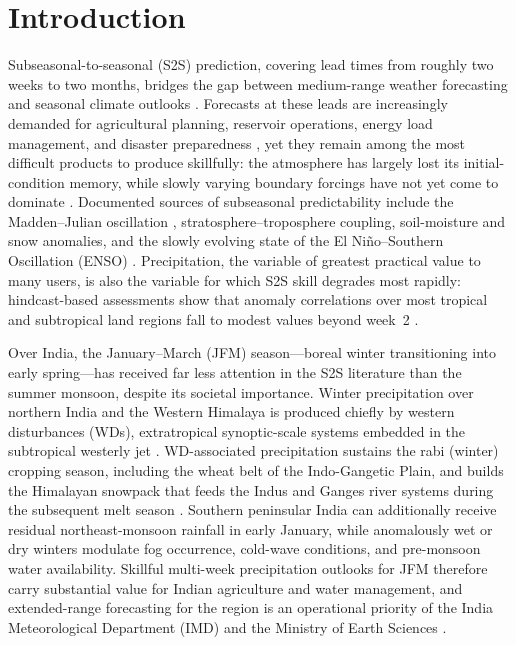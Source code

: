 \documentclass[11pt,a4paper]{article}
\begin{document}
\section{Introduction}\label{sec:intro}

Subseasonal-to-seasonal (S2S) prediction, covering lead times from
roughly two weeks to two months, bridges the gap between medium-range
weather forecasting and seasonal climate outlooks
\citep{vitart2017,nas2016}. Forecasts at these leads are increasingly
demanded for agricultural planning, reservoir operations, energy load
management, and disaster preparedness \citep{white2017}, yet they
remain among the most difficult products to produce skillfully: the
atmosphere has largely lost its initial-condition memory, while slowly
varying boundary forcings have not yet come to dominate
\citep{mariotti2020}. Documented sources of subseasonal predictability
include the Madden--Julian oscillation \citep[MJO;][]{zhang2005},
stratosphere--troposphere coupling, soil-moisture and snow anomalies,
and the slowly evolving state of the El Ni\~no--Southern Oscillation
(ENSO) \citep{mariotti2020,domeisen2022}. Precipitation, the variable
of greatest practical value to many users, is also the variable for
which S2S skill degrades most rapidly: hindcast-based assessments show
that anomaly correlations over most tropical and subtropical land
regions fall to modest values beyond week~2
\citep{deandrade2019,pegion2019}.

Over India, the January--March (JFM) season---boreal winter
transitioning into early spring---has received far less attention in
the S2S literature than the summer monsoon, despite its societal
importance. Winter precipitation over northern India and the Western
Himalaya is produced chiefly by western disturbances (WDs),
extratropical synoptic-scale systems embedded in the subtropical
westerly jet \citep{dimri2015,hunt2018}. WD-associated precipitation
sustains the rabi (winter) cropping season, including the wheat belt of
the Indo-Gangetic Plain, and builds the Himalayan snowpack that feeds
the Indus and Ganges river systems during the subsequent melt season
\citep{dimri2015}. Southern peninsular India can additionally receive
residual northeast-monsoon rainfall in early January, while anomalously
wet or dry winters modulate fog occurrence, cold-wave conditions, and
pre-monsoon water availability. Skillful multi-week precipitation
outlooks for JFM therefore carry substantial value for Indian
agriculture and water management, and extended-range forecasting for
the region is an operational priority of the India Meteorological
Department (IMD) and the Ministry of Earth Sciences
\citep{rao2019,pattanaik2019}.
\end{document}
